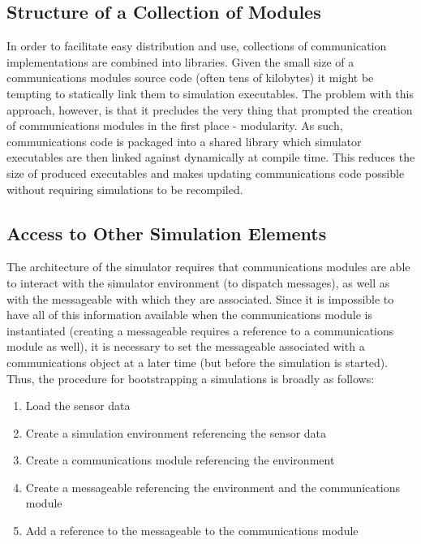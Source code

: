 \subsection{Structure of a Collection of Modules}
	
In order to facilitate easy distribution and use, collections of communication implementations are combined into libraries. Given the small size of a communications modules source code (often tens of kilobytes) it might be tempting to statically link them to simulation executables. The problem with this approach, however, is that it precludes the very thing that prompted the creation of communications modules in the first place - modularity. As such, communications code is packaged into a shared library which simulator executables are then linked against dynamically at compile time. This reduces the size of produced executables and makes updating communications code possible without requiring simulations to be recompiled.

\subsection{Access to Other Simulation Elements}
		
The architecture of the simulator requires that communications modules are able to interact with the simulator environment (to dispatch messages), as well as with the messageable with which they are associated. Since it is impossible to have all of this information available when the communications module is instantiated (creating a messageable requires a reference to a communications module as well), it is necessary to set the messageable associated with a communications object at a later time (but before the simulation is started). Thus, the procedure for bootstrapping a simulations is broadly as follows:

\begin{enumerate}
	\item Load the sensor data
	\item Create a simulation environment referencing the sensor data
	\item Create a communications module referencing the environment
	\item Create a messageable referencing the environment and the communications module
	\item Add a reference to the messageable to the communications module
\end{enumerate}

